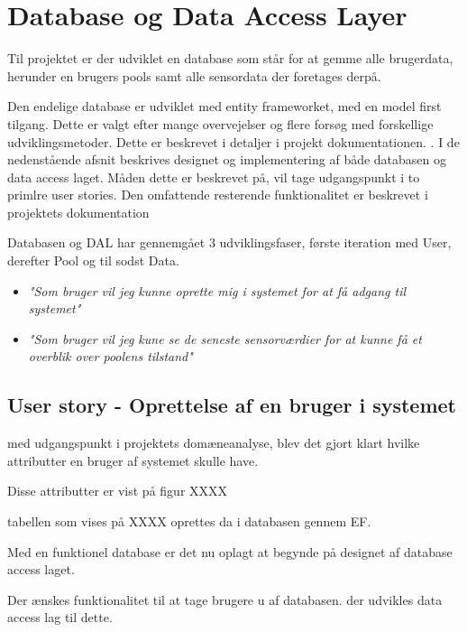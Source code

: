 \section{Database og Data Access Layer}\label{sec:designdatabase}

Til projektet er der udviklet en database som står for at gemme alle brugerdata, herunder en brugers pools samt alle sensordata der foretages derpå.

Den endelige database er udviklet med entity frameworket, med en model first tilgang. Dette er valgt efter mange overvejelser og flere forsøg med forskellige udviklingsmetoder. Dette er beskrevet i detaljer i projekt dokumentationen. . I de nedenstående afsnit beskrives designet og implementering af både databasen og data access laget. Måden dette er beskrevet på, vil tage udgangspunkt i to primlre user stories. Den omfattende resterende funktionalitet er beskrevet i projektets dokumentation 

Databasen og DAL har gennemgået 3 udviklingsfaser, første iteration med User, derefter Pool og til sodst Data.

\begin{itemize}
	\item \textit{"Som bruger vil jeg kunne oprette mig i systemet for at få adgang til systemet"}
	\item \textit{"Som bruger vil jeg kune se de seneste sensorværdier for at kunne få et overblik over poolens tilstand"}
\end{itemize}

\subsection{User story - Oprettelse af en bruger i systemet}

med udgangspunkt i projektets domæneanalyse, blev det gjort klart hvilke attributter en bruger af systemet skulle have.

Disse attributter er vist på figur XXXX


tabellen som vises på XXXX oprettes da i databasen gennem EF.

Med en funktionel database er det nu oplagt at begynde på designet af database access laget.

Der ænskes funktionalitet til at tage brugere u af databasen. der udvikles data access lag til dette.

